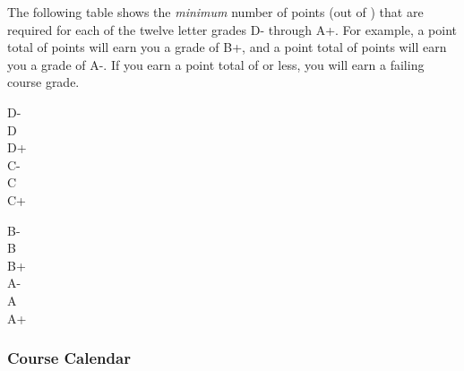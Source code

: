\documentclass[12pt,fullpage]{article}
\newcounter{ex}\setcounter{ex}{0}
\newenvironment{mypar}[2]
  {\begin{list}{}%
    {\setlength\leftmargin{#1}
    \setlength\rightmargin{#2}}
    \item[]}
  {\end{list}}
\begin{document}
 
 
 
 
 
\noindent The following table shows the \emph{minimum} number of points (out of \points) that
 are required for each of the twelve letter grades D- through A+. For
 example, a point total of \Bp\/  points will earn you a grade of B+,  and 
 a point total of \Am\/ points will earn you a grade of A-. If you earn a point
 total of \F\/  or less, you will earn a failing course grade.
  
  \vspace{0.1in}
      \begin{minipage}{5.5in}
   \centering 
 \begin{mypar}{0.25in}{0.25in}
     \begin{minipage}{2.5in}
         D-  \dotfill \Dm \\
         D \dotfill \D \\
         D+ \dotfill \Dp \\
         C- \dotfill \Cm  \\
         C \dotfill \C \\
         C+ \dotfill \Cp 
         \end{minipage}
     \phantom{xxx}
     \begin{minipage}{2.5in}
         B- \dotfill \Bm \\
         B \dotfill  \B \\
         B+ \dotfill  \Bp\\
         A- \dotfill  \Am \\
         A \dotfill  \A \\
         A+ \dotfill  \Ap
     \end{minipage}
 \end{mypar} 
 \end{minipage}

 \subsubsection*{Course Calendar}
\end{document}
